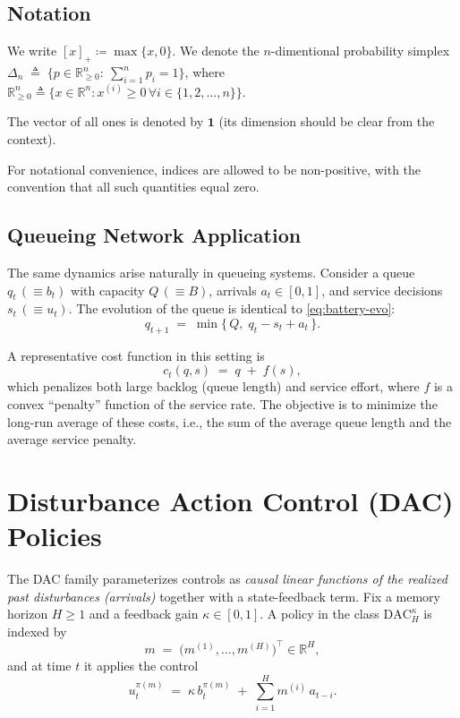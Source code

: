 \subsection{Notation}
We write \([x]_+ \coloneqq \max\{x,0\}\). We denote the $n$-dimentional probability simplex \(\Delta_n \;\triangleq\; \Big\{p\in\mathbb{R}^n_{\ge 0}:\ \sum_{i=1}^n p_i = 1\Big\}\), where $\mathbb{R}^n_{\ge 0} \triangleq \{x \in \mathbb{R}^n : x^{(i)}\geq 0 \,\forall i\in\{1,2,\ldots,n\}\}$.


The vector of all ones is denoted by \(\mathbf{1}\) (its dimension should be clear from the context).


For notational convenience, indices are allowed to be non-positive, with the convention that all such quantities equal zero.

\subsection{Queueing Network Application}

The same dynamics arise naturally in queueing systems.  
Consider a queue \(q_t \,(\equiv b_t)\) with capacity \(Q \,(\equiv B)\), arrivals \(a_t \in [0,1]\), and service decisions \(s_t \,(\equiv u_t)\).  
The evolution of the queue is identical to \eqref{eq:battery-evo}:
\begin{equation*}
q_{t+1} \;=\; \min\{\,Q,\; q_t - s_t + a_t\,\}.
\end{equation*}

A representative cost function in this setting is
\[
c_t(q,s) \;=\; q \;+\; f(s),
\]
which penalizes both large backlog (queue length) and service effort, where \(f\) is a convex “penalty” function of the service rate.  
The objective is to minimize the long-run average of these costs, i.e., the sum of the average queue length and the average service penalty.


\section{Disturbance Action Control (DAC) Policies}
\label{sec:dac}

The DAC family parameterizes controls as \emph{causal linear functions of the realized past disturbances (arrivals)} together with a state-feedback term. Fix a memory horizon \(H\ge 1\) and a feedback gain \(\kappa\in[0,1]\). A policy in the class \(\mathrm{DAC}_H^\kappa\) is indexed by
\[
m \;=\; \bigl(m^{(1)},\dots,m^{(H)}\bigr)^\top \in \mathbb{R}^{H},
\]
and at time \(t\) it applies the control
\begin{equation}\label{eq:dac-u}
    u_t^{\pi(m)} \;=\; \kappa\, b_t^{\pi(m)} \;+\; \sum_{i=1}^{H} m^{(i)}\, a_{t-i}.
\end{equation}

